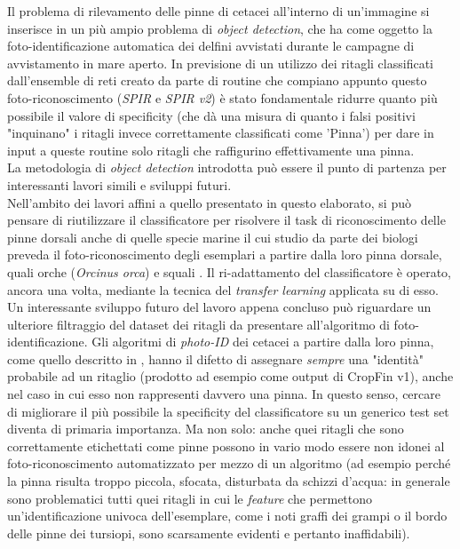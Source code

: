 Il problema di rilevamento delle pinne di cetacei all'interno di un'immagine si inserisce in un più ampio problema di \textit{object detection}, che ha come oggetto la foto-identificazione automatica dei delfini avvistati durante le campagne di avvistamento in mare aperto. In previsione di un utilizzo dei ritagli classificati dall'ensemble di reti creato da parte di routine che compiano appunto questo foto-riconoscimento (\textit{SPIR} \cite{maglietta} e \textit{SPIR v2}\cite{emanuele}) è stato fondamentale ridurre quanto più possibile il valore di specificity (che dà una misura di quanto i falsi positivi "inquinano" i ritagli invece correttamente classificati come 'Pinna') per dare in input a queste routine solo ritagli che raffigurino effettivamente una pinna.\\

La metodologia di \textit{object detection} introdotta può essere il punto di partenza per interessanti lavori simili e sviluppi futuri.\\

Nell'ambito dei lavori affini a quello presentato in questo elaborato, si può pensare di riutilizzare il classificatore per risolvere il task di riconoscimento delle pinne dorsali anche di quelle specie marine il cui studio da parte dei biologi preveda il foto-riconoscimento degli esemplari a partire dalla loro pinna dorsale, quali orche (\textit{Orcinus orca}) \cite{orche} e squali \cite{squali}. Il ri-adattamento del classificatore è operato, ancora una volta, mediante la tecnica del \textit{transfer learning} applicata su di esso.\\

Un interessante sviluppo futuro del lavoro appena concluso può riguardare un ulteriore filtraggio del dataset dei ritagli da presentare all'algoritmo di foto-identificazione.
Gli algoritmi di \textit{photo-ID} dei cetacei a partire dalla loro pinna, come quello descritto in \cite{emanuele}, hanno il difetto di assegnare \emph{sempre} una "identità" probabile ad un ritaglio (prodotto ad esempio come output di CropFin v1), anche nel caso in cui esso non rappresenti davvero una pinna. In questo senso, cercare di migliorare il più possibile la specificity del classificatore su un generico test set diventa di primaria importanza. Ma non solo: anche quei ritagli che sono correttamente etichettati come pinne possono in vario modo essere non idonei al foto-riconoscimento automatizzato per mezzo di un algoritmo (ad esempio perché la pinna risulta troppo piccola, sfocata, disturbata da schizzi d'acqua: in generale sono problematici tutti quei ritagli in cui le \textit{feature} che permettono un'identificazione univoca dell'esemplare, come i noti graffi dei grampi o il bordo delle pinne dei tursiopi, sono scarsamente evidenti e pertanto inaffidabili).

